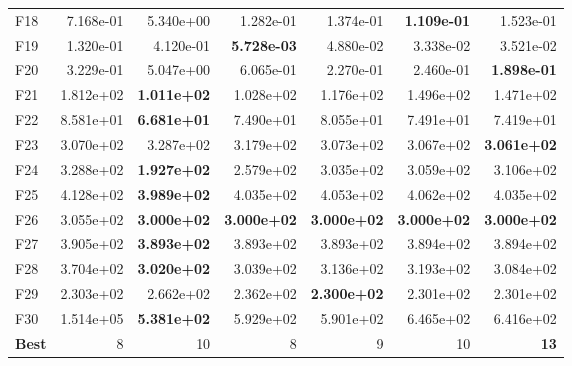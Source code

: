\begin{tabular}{lrrrrrr}
F18 & 7.168e-01 & 5.340e+00 & 1.282e-01 & 1.374e-01 & \textbf{1.109e-01} & 1.523e-01 \\
F19 & 1.320e-01 & 4.120e-01 & \textbf{5.728e-03} & 4.880e-02 & 3.338e-02 & 3.521e-02 \\
F20 & 3.229e-01 & 5.047e+00 & 6.065e-01 & 2.270e-01 & 2.460e-01 & \textbf{1.898e-01} \\
F21 & 1.812e+02 & \textbf{1.011e+02} & 1.028e+02 & 1.176e+02 & 1.496e+02 & 1.471e+02 \\
F22 & 8.581e+01 & \textbf{6.681e+01} & 7.490e+01 & 8.055e+01 & 7.491e+01 & 7.419e+01 \\
F23 & 3.070e+02 & 3.287e+02 & 3.179e+02 & 3.073e+02 & 3.067e+02 & \textbf{3.061e+02} \\
F24 & 3.288e+02 & \textbf{1.927e+02} & 2.579e+02 & 3.035e+02 & 3.059e+02 & 3.106e+02 \\
F25 & 4.128e+02 & \textbf{3.989e+02} & 4.035e+02 & 4.053e+02 & 4.062e+02 & 4.035e+02 \\
F26 & 3.055e+02 & \textbf{3.000e+02} & \textbf{3.000e+02} & \textbf{3.000e+02} & \textbf{3.000e+02} & \textbf{3.000e+02} \\
F27 & 3.905e+02 & \textbf{3.893e+02} & 3.893e+02 & 3.893e+02 & 3.894e+02 & 3.894e+02 \\
F28 & 3.704e+02 & \textbf{3.020e+02} & 3.039e+02 & 3.136e+02 & 3.193e+02 & 3.084e+02 \\
F29 & 2.303e+02 & 2.662e+02 & 2.362e+02 & \textbf{2.300e+02} & 2.301e+02 & 2.301e+02 \\
F30 & 1.514e+05 & \textbf{5.381e+02} & 5.929e+02 & 5.901e+02 & 6.465e+02 & 6.416e+02 \\
\midrule
\textbf{Best} & 8 & 10 & 8 & 9 & 10 & \textbf{13} \\
\bottomrule
\end{tabular}